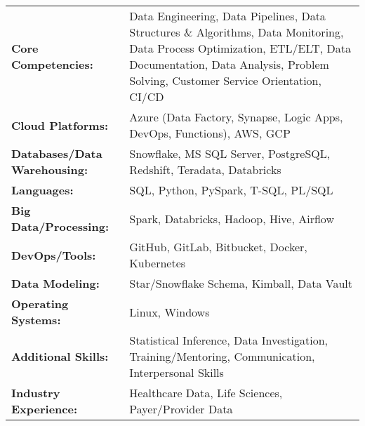 \begin{onecolentry}
    \begin{tabularx}{\linewidth}{l X}
        \textbf{Core Competencies:} & Data Engineering, Data Pipelines, Data Structures \& Algorithms, Data Monitoring, Data Process Optimization, ETL/ELT, Data Documentation, Data Analysis, Problem Solving, Customer Service Orientation, CI/CD \\
        \textbf{Cloud Platforms:} & Azure (Data Factory, Synapse, Logic Apps, DevOps, Functions), AWS, GCP \\
        \textbf{Databases/Data Warehousing:} & Snowflake, MS SQL Server, PostgreSQL, Redshift, Teradata, Databricks \\
        \textbf{Languages:} & SQL, Python, PySpark, T-SQL, PL/SQL \\
        \textbf{Big Data/Processing:} & Spark, Databricks, Hadoop, Hive, Airflow \\
        \textbf{DevOps/Tools:} & GitHub, GitLab, Bitbucket, Docker, Kubernetes \\
        \textbf{Data Modeling:} & Star/Snowflake Schema, Kimball, Data Vault \\
        \textbf{Operating Systems:} & Linux, Windows \\
        \textbf{Additional Skills:} & Statistical Inference, Data Investigation, Training/Mentoring, Communication, Interpersonal Skills \\
        \textbf{Industry Experience:} & Healthcare Data, Life Sciences, Payer/Provider Data \\
    \end{tabularx}
\end{onecolentry}